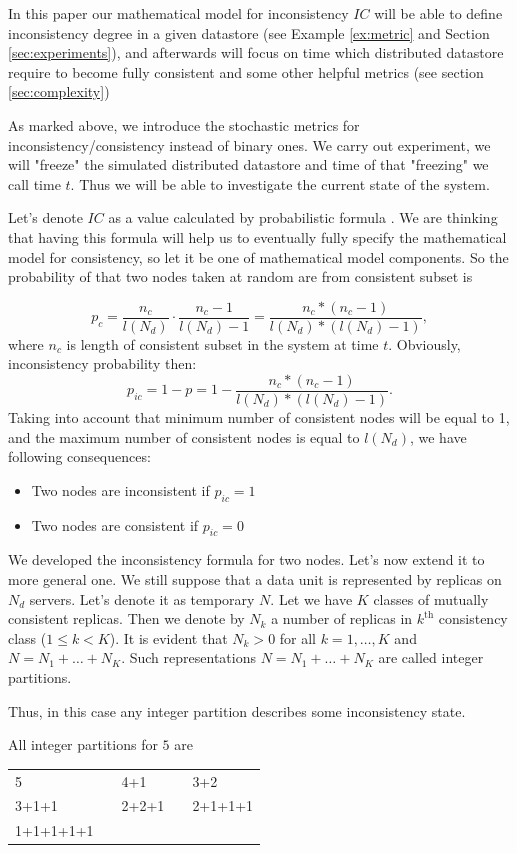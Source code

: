 \documentclass{llncs}
\begin{document}
In this paper our mathematical model for inconsistency $IC$ will be able to define inconsistency degree in a given datastore (see Example \ref{ex:metric} and Section \ref{sec:experiments}), and afterwards will focus on time which distributed datastore require to become fully consistent and some other helpful metrics (see section \ref{sec:complexity})

As marked above, we introduce the stochastic metrics for inconsistency/consistency instead of binary ones.
We carry out experiment, we will "freeze" the simulated distributed datastore and time of that "freezing" we call time $t$. Thus we will be able to investigate the current state of the system.

Let's denote  $IC$ as a value calculated by probabilistic formula .
We are thinking that having this formula will help us to eventually fully specify the mathematical model for consistency, so let it be one of mathematical model components.
So the probability of that two nodes taken at random are from consistent subset is

\[p_c = \frac{n_c}{l(N_d)} \cdot \frac{n_c - 1}{l(N_d) - 1} = \frac{n_c * (n_c - 1)}{l(N_d)* (l(N_d) -1)},\]
 where $n_c$ is length of consistent subset in the system at time $t$.
Obviously, inconsistency probability then:
\[p_{ic} = 1 - p = 1 - \frac{n_c * (n_c - 1)}{l(N_d)* (l(N_d) -1)}.\]
Taking into account that minimum number of consistent nodes will be equal to 1, and the maximum number of consistent nodes is equal to $l(N_d)$, we have following consequences:
\begin{itemize}
\item Two nodes are inconsistent if  $p_{ic} = 1$
\item Two nodes are consistent if $p_{ic} = 0$ 
\end{itemize}

We developed the inconsistency formula for two nodes. Let's now extend it to more general one.
We still suppose that a data unit is represented by replicas on $N_d$ servers. Let's denote it as temporary $N$.
Let we have $K$ classes of mutually consistent replicas.
Then we denote by $N_k$ a number of replicas in $k^\mathrm{th}$ consistency class ($1\leq k<K$).
It is evident that $N_k>0$ for all $k=1,\ldots,K$ and $N=N_1+\ldots+N_K$.
Such representations $N=N_1+\ldots+N_K$ are called integer partitions.


\noindent Thus, in this case any integer partition describes some inconsistency state.

\begin{example}\label{ex:partitions}
All integer partitions for $5$ are
\begin{center}
\begin{tabular}{lclcl}
	5 & & 4+1 & & 3+2\\
	3+1+1 &\hspace*{10pt}& 2+2+1 &\hspace*{10pt}& 2+1+1+1\\
	1+1+1+1+1
\end{tabular}
\end{center}
\end{example}
\end{document}
